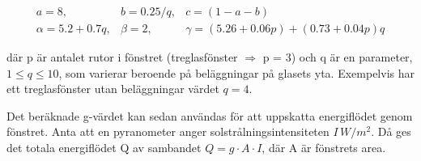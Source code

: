 \begin{eqnarray}
a = 8, & b = 0.25/q, & c = (1-a-b) \nonumber \\
\alpha = 5.2 + 0.7q, & \beta = 2, & \gamma = (5.26+0.06p) + (0.73+0.04p)q
\end{eqnarray}

där p är antalet rutor i fönstret (treglasfönster $\Rightarrow$ p = 3) och q är en parameter, $1 \le q \le 10$, som varierar beroende på beläggningar på glasets yta. Exempelvis har ett treglasfönster utan beläggningar värdet $q=4$.

Det beräknade g-värdet kan sedan användas för att uppskatta energiflödet genom fönstret. Anta att en pyranometer anger solstrålningsintensiteten $\unit{I\, }{W/m^2}$. Då ges det totala energiflödet Q av sambandet $Q = g \cdot A \cdot I$, där A är fönstrets area.
